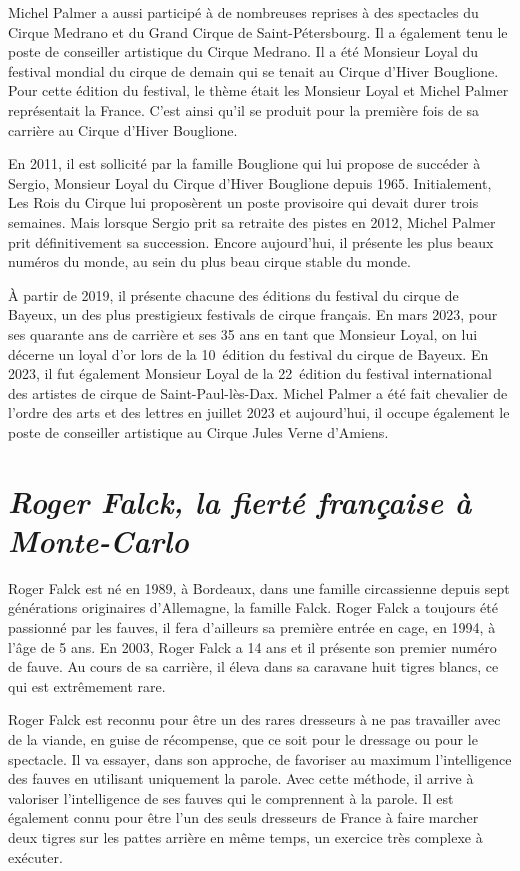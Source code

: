Michel Palmer a aussi participé à de nombreuses reprises à des spectacles du Cirque Medrano et du Grand Cirque de Saint-Pétersbourg. Il a également tenu le poste de conseiller artistique du Cirque Medrano. Il a été Monsieur Loyal du festival mondial du cirque de demain qui se tenait au Cirque d’Hiver Bouglione. Pour cette édition du festival, le thème était les Monsieur Loyal et Michel Palmer représentait la France. C’est ainsi qu’il se produit pour la première fois de sa carrière au Cirque d’Hiver Bouglione.

En 2011, il est sollicité par la famille Bouglione qui lui propose de succéder à Sergio, Monsieur Loyal du Cirque d’Hiver Bouglione depuis 1965. Initialement, Les Rois du Cirque lui proposèrent un poste provisoire qui devait durer trois semaines. Mais lorsque Sergio prit sa retraite des pistes en 2012, Michel Palmer prit définitivement sa succession. Encore aujourd’hui, il présente les plus beaux numéros du monde, au sein du plus beau cirque stable du monde.

À partir de 2019, il présente chacune des éditions du festival du cirque de Bayeux, un des plus prestigieux festivals de cirque français. En mars 2023, pour ses quarante ans de carrière et ses 35 ans en tant que Monsieur Loyal, on lui décerne un loyal d’or lors de la 10\ieme~édition du festival du cirque de Bayeux. En 2023, il fut également Monsieur Loyal de la 22\ieme~édition du festival international des artistes de cirque de Saint-Paul-lès-Dax. Michel Palmer a été fait chevalier de l’ordre des arts et des lettres en juillet 2023 et aujourd’hui, il occupe également le poste de conseiller artistique au Cirque Jules Verne d’Amiens. 

\section*{\textit{Roger Falck, la fierté française à Monte-Carlo }}
{}

Roger Falck est né en 1989, à Bordeaux, dans une famille circassienne depuis sept générations originaires d’Allemagne, la famille Falck. Roger Falck a toujours été passionné par les fauves, il fera d’ailleurs sa première entrée en cage, en 1994, à l’âge de 5 ans. En 2003, Roger Falck a 14 ans et il présente son premier numéro de fauve. Au cours de sa carrière, il éleva dans sa caravane huit tigres blancs, ce qui est extrêmement rare.

Roger Falck est reconnu pour être un des rares dresseurs à ne pas travailler avec de la viande, en guise de récompense, que ce soit pour le dressage ou pour le spectacle. Il va essayer, dans son approche, de favoriser au maximum l’intelligence des fauves en utilisant uniquement la parole. Avec cette méthode, il arrive à valoriser l’intelligence de ses fauves qui le comprennent à la parole. Il est également connu pour être l’un des seuls dresseurs de France à faire marcher deux tigres sur les pattes arrière en même temps, un exercice très complexe à exécuter.

